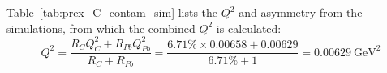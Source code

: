 Table~\ref{tab:prex_C_contam_sim} lists the $Q^2$ and asymmetry from the simulations,
from which the combined $Q^2$ is calculated:
\begin{equation}
    Q^2 = \frac{R_C Q^2_C + R_{Pb} Q^2_{Pb}}{R_C + R_{Pb}} 
	= \frac{6.71\%\times 0.00658 + 0.00629}{6.71\% + 1} = 0.00629 \ \mathrm{GeV}^2
\end{equation}

\begin{comment}
\begin{landscape}
    \begin{table}
    \centering
    \begin{tabular}{c c c | c c c c c c c c c c}
	\hline
	\multicolumn{2}{c}{target thicknesses}	& \multirow{2}{*}{\makecell{p cut \\ (MeV)}}	& \multicolumn{2}{c}{$Q^2$ Pb ($\mathrm{GeV}^2$)}    & \multicolumn{2}{c}{$Q^2$ C}	& \multicolumn{2}{c}{$Q^2$ C US}  & \multicolumn{2}{c}{$Q^2$ C DS}  & \multicolumn{2}{c}{Asym (ppm)}	\\
	Pb & C	&   & vertex	& post vertex	& V	& P-V	& V & P-V   &V	& P-V	& Pb	& C \\
	\hline
	-5\%	& -5\%	& 2.2	& 0.00608   & 0.00625   & 0.00649   & 0.00658	& 0.00641   & 0.00658	& 0.00658   & 0.00658	& 0.55774   & 0.53861 \\
	-5\%	&  0\%	& 2.2	& 0.00609   & 0.00626   & 0.00648   & 0.00656	& 0.00643   & 0.00658	& 0.00654   & 0.00654	& 0.55809   & 0.53776 \\
	-5\%	&  5\%	& 2.2	& 0.00610   & 0.00627   & 0.00650   & 0.00658	& 0.00643   & 0.00658	& 0.00657   & 0.00657	& 0.55883   & 0.53932 \\
	 0\%	& -5\%	& 2.2	& 0.00611   & 0.00627   & 0.00650   & 0.00657	& 0.00643   & 0.00657	& 0.00657   & 0.00657	& 0.55942   & 0.53917 \\
	 0\%	&  0\%	& 2.2	& 0.00609   & 0.00626   & 0.00650   & 0.00658	& 0.00641   & 0.00657	& 0.00660   & 0.00660	& 0.55824   & 0.53936 \\
	 0\%	&  5\%	& 2.2	& 0.00610   & 0.00627   & 0.00649   & 0.00658	& 0.00641   & 0.00658	& 0.00658   & 0.00658	& 0.55847   & 0.53847 \\
	 5\%	& -5\%	& 2.2	& 0.00607   & 0.00625   & 0.00647   & 0.00657	& 0.00637   & 0.00655	& 0.00658   & 0.00658	& 0.55674   & 0.53696 \\
	 5\%	&  0\%	& 2.2	& 0.00609   & 0.00627   & 0.00649   & 0.00658	& 0.00641   & 0.00659	& 0.00657   & 0.00657	& 0.55782   & 0.53808 \\
	 5\%	&  5\%	& 2.2	& 0.00610   & 0.00629   & 0.00650   & 0.00659	& 0.00643   & 0.00659	& 0.00659   & 0.00659	& 0.55847   & 0.53962 \\
	\hline
	\multicolumn{3}{c}{average} &0.00609 & 0.00626	& 0.00649   & 0.00658	& 0.00642   & 0.00658	& 0.00658   & 0.00658	& 0.55820   & 0.53859 \\
    \end{tabular}
    \caption{Average $Q^2$}
    \end{table}
\end{landscape}


\end{comment}
